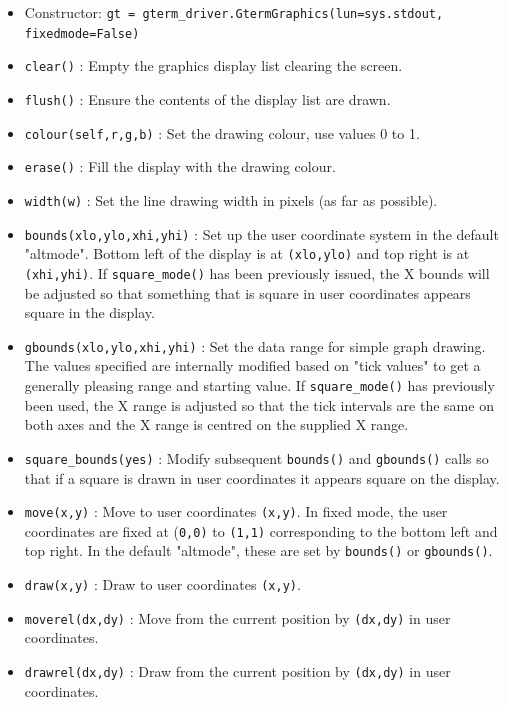\documentclass[a4paper,twoside,11pt]{article}
\begin{document}
\begin{itemize}
\item Constructor: \texttt{gt = gterm\_driver.GtermGraphics(lun=sys.stdout, fixedmode=False)}
\item \texttt{clear()} : Empty the graphics display list clearing the screen.
\item \texttt{flush()} : Ensure the contents of the display list are drawn.
\item \texttt{colour(self,r,g,b)} : Set the drawing colour, use values 0 to 1.
\item \texttt{erase()} : Fill the display with the drawing colour.
\item \texttt{width(w)} : Set the line drawing width in pixels (as far as possible).
\item \texttt{bounds(xlo,ylo,xhi,yhi)} : Set up the user coordinate system in the default "altmode". 
		Bottom left of the display is at \texttt{(xlo,ylo)}
        and top right is at \texttt{(xhi,yhi)}. If \texttt{square\_mode()} has been previously issued, the
        X bounds will be adjusted so that something that is square in user coordinates appears
        square in the display.
\item \texttt{gbounds(xlo,ylo,xhi,yhi)} : Set the data range for simple graph drawing. The values specified are internally modified
        based on "tick values" to get a generally pleasing range and starting value. If \texttt{square\_mode()}
        has previously been used, the X range is adjusted so that the tick intervals are the same on both
        axes and the X range is centred on the supplied X range.
\item \texttt{square\_bounds(yes)} : Modify subsequent \texttt{bounds()} and \texttt{gbounds()} calls so that if a 
		square is drawn in user coordinates it appears square on the display.
\item \texttt{move(x,y)} : Move to user coordinates \texttt{(x,y)}. In fixed mode, the user coordinates
        are fixed at (\texttt{0,0)} to \texttt{(1,1)} corresponding to the bottom left and top right.
        In the default "altmode", these are set by \texttt{bounds()} or \texttt{gbounds()}.
\item \texttt{draw(x,y)} : Draw to user coordinates \texttt{(x,y)}.
\item \texttt{moverel(dx,dy)} : Move from the current position by \texttt{(dx,dy)} in user coordinates.
\item \texttt{drawrel(dx,dy)} : Draw from the current position by \texttt{(dx,dy)} in user coordinates.

\end{itemize}
\end{document}
